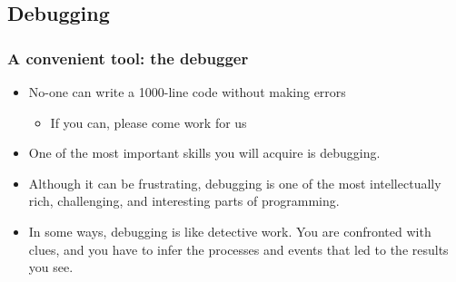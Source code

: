 \documentclass[11pt,table,final,fleqn,xcolor={usenames,dvipsnames},unknownkeysallowed,handout]{beamer}
\begin{document}
\subsection*{Debugging}
\begin{frame}
\frametitle{A convenient tool: the debugger}
\begin{itemize}
   \item No-one can write a 1000-line code without making errors
  \begin{itemize}
     \item If you can, please come work for us
  \end{itemize}
   \item One of the most important skills you will acquire is debugging.
   \item Although it can be frustrating, debugging is one of the most intellectually rich, challenging, and interesting parts of programming.
   \item In some ways, debugging is like detective work. You are confronted with clues, and you have to infer the processes and events that led to the results you see.
\end{itemize}
\end{frame}
\end{document}
